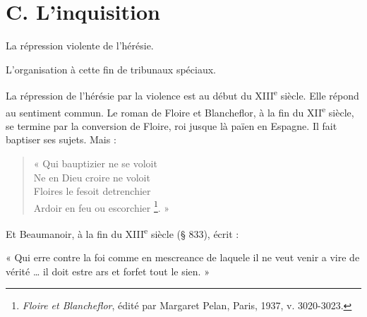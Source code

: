 \documentclass[french,twoside]{book} %
\newcommand{\labelchar}[1]{{\color{rubric}\bf #1}}
\newenvironment{quoteblock}%
  {\begin{quoting}}
  {\end{quoting}}
\newenvironment{quotebar}{%
    \def\FrameCommand{{\color{rubric!10!}\vrule width 0.5em} \hspace{0.9em}}%
    \def\OuterFrameSep{\itemsep} %
    \MakeFramed {\advance\hsize-\width \FrameRestore}
  }%
  {%
    \endMakeFramed
  }
\renewenvironment{quoteblock}%
  {%
    \small
    \savenotes
    \begin{quotebar}
  }
  {%
    \end{quotebar}
    \spewnotes
  }
\begin{document}
\section[C. L’inquisition]{C. L’inquisition}
\label{c10c}

\begin{listalpha}[itemsep=0pt,]
\item[] \hspace{-1.5em}{\bfseries Il faut distinguer :}
\item La répression violente de l’hérésie.
\item L’organisation à cette fin de tribunaux spéciaux.

\end{listalpha}\noindent \labelchar{a)} La répression de l’hérésie par la violence est au début du XIII\textsuperscript{e} siècle. Elle répond au sentiment commun. Le roman de Floire et Blancheflor, à la fin du XII\textsuperscript{e} siècle, se termine par la conversion de Floire, roi jusque là païen en Espagne. Il fait baptiser ses sujets. Mais :\par


\begin{verse}
« Qui bauptizier ne se voloit\\
Ne en Dieu croire ne voloit\\
Floires le fesoit detrenchier\\
Ardoir en feu ou escorchier \footnote{{\itshape Floire et Blancheflor}, édité par Margaret Pelan, Paris, 1937, v. 3020-3023.}. »\\
\end{verse}

\noindent Et Beaumanoir, à la fin du XIII\textsuperscript{e} siècle (§ 833), écrit :\par

\begin{quoteblock}
\noindent « Qui erre contre la foi comme en mescreance de laquele il ne veut venir a vire de vérité … il doit estre ars et forfet tout le sien. »\end{quoteblock}
\end{document}
